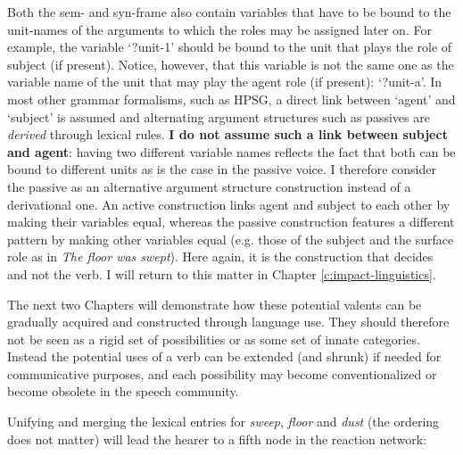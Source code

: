 Both the sem- and syn-frame also contain variables that have to be bound to the unit-names of the arguments to which the roles may be assigned later on. For example, the variable `?unit-1' should be bound to the unit that plays the role of subject (if present). Notice, however, that this variable is not the same one as the variable name of the unit that may play the agent role (if present): `?unit-a'. In most other grammar formalisms, such as HPSG, a direct link between `agent' and `subject' is assumed and alternating argument structures such as passives are {\em derived} through lexical rules. {\bfseries I do not assume such a link between subject and agent}: having two different variable names reflects the fact that both can be bound to different units as is the case in the passive voice. I therefore consider the passive as an alternative argument structure construction instead of a derivational one. An active construction links agent and subject to each other by making their variables equal, whereas the passive construction features a different pattern by making other variables equal (e.g. those of the subject and the surface role as in {\em The floor was swept}). Here again, it is the construction that decides and not the verb. I will return to this matter in Chapter \ref{c:impact-linguistics}.

The next two Chapters will demonstrate how these potential valents can be gradually acquired and constructed through language use. They should therefore not be seen as a rigid set of possibilities or as some set of innate categories. Instead the potential uses of a verb can be extended (and shrunk) if needed for communicative purposes, and each possibility may become conventionalized or become obsolete in the speech community.

Unifying and merging the lexical entries for {\em sweep}, {\em floor} and {\em dust} (the ordering does not matter) will lead the hearer to a fifth node in the reaction network:


